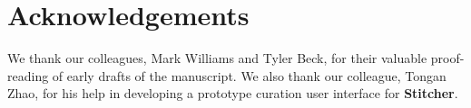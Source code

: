 \documentclass{bioinfo}
\newcommand\st{\textbf{Stitcher}}
\begin{document}
\section*{Acknowledgements}

We thank our colleagues, Mark Williams and Tyler Beck, for their valuable proof-reading of early drafts of the manuscript. We also thank our colleague, Tongan Zhao, for his help in developing a prototype curation user interface for \st.


%
%
%
%
%
%
%

\end{document}
